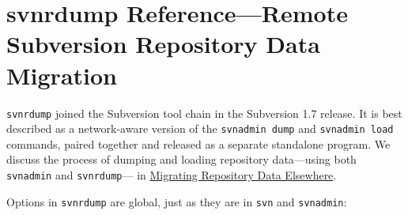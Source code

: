 \chapter{svnrdump Reference---Remote Subversion Repository Data
Migration}\label{svn.ref.svnrdump}

\texttt{svnrdump} joined the Subversion tool chain in the Subversion 1.7
release. It is best described as a network-aware version of the
\texttt{svnadmin\ dump} and \texttt{svnadmin\ load} commands, paired
together and released as a separate standalone program. We discuss the
process of dumping and loading repository data---using both
\texttt{svnadmin} and \texttt{svnrdump}--- in
\hyperref[svn.reposadmin.maint.migrate]{Migrating Repository Data
Elsewhere}.

Options in \texttt{svnrdump} are global, just as they are in
\texttt{svn} and \texttt{svnadmin}:

\protect{}\label{svn.ref.svnrdump.sw}{}

